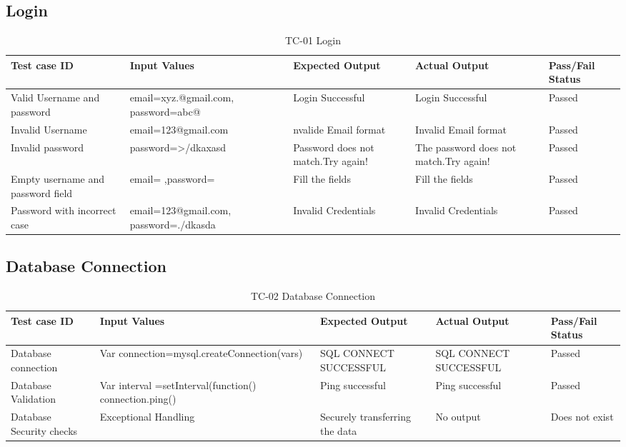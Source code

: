 \documentclass[12pt,a4paper]{article}
\begin{document}
\subsection{Login}
    \begin{table}[h]
\caption{TC-01 Login}
    \centering
    \begin{tabular}{|p{9em}|p{9em}|p{4em}|p{4em}|p{4em}|}
    \hline
   \textbf{Test case ID}&\textbf{Input Values}&\textbf{Expected Output}
&\textbf{Actual Output}
&\textbf{Pass/Fail Status} \\%
       \hline
     Valid Username and password &email=xyz.@gmail.com,
     \newline password=abc@&Login Successful&Login Successful&Passed \\%
       \hline
      Invalid Username &email=123@gmail.com&nvalide Email format&Invalid Email format&Passed \\%
       \hline
      Invalid password  &password=>/dkaxasd&Password does not match.Try again!&The password does not match.Try again!&Passed \\%
       \hline
       Empty username and password field &email= ,password=&Fill the fields&Fill the fields&Passed \\%
       \hline
       Password with incorrect case &email=123@gmail.com, password=./dkasda&Invalid Credentials&Invalid Credentials&Passed \\%
       \hline
    \end{tabular} 
    \end{table}


\newpage
    \subsection{Database Connection}
    \begin{table}[h]
\caption{TC-02 Database Connection}
    \centering
    \begin{tabular}{|p{9em}|p{9em}|p{4em}|p{4em}|p{4em}|}
    \hline
   \textbf{Test case ID}&\textbf{Input Values}&\textbf{Expected Output}
&\textbf{Actual Output}
&\textbf{Pass/Fail Status} \\%
       \hline
   Database connection &Var connection=\newline mysql.createConnection\newline(vars)&SQL CONNECT SUCCESSFUL&SQL CONNECT SUCCESSFUL&Passed\\
    \hline
     Database Validation &Var interval =setInterval(function(){
connection.ping()
}
&Ping successful&Ping successful&Passed\\
    \hline
     Database Security checks &Exceptional Handling&Securely transferring the data&No output&Does not exist\\
    \hline
   \end{tabular} 
    \end{table}
\end{document}
